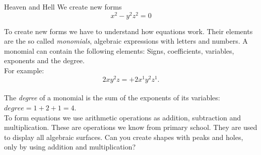 \begin{surferPage}{Heaven and Hell}
We create new forms \\
\smallskip
\[x^2	- y^2z^2	= 0\]

\singlespacing
To create new forms we have to understand how equations work. Their elements are the so called  {\it monomials}, algebraic expressions with letters and numbers.
\singlespacing
A monomial can contain the following elements:
Signs, coefficients, variables, exponents and the degree.\\
\singlespacing
For example: 
\smallskip
\[2xy^2z = +2x^1y^2z^1.\]
\\
\smallskip
The  {\it degree} of a monomial is the sum of the exponents of its variables: $degree = 1+2+1=4$.  \\
\singlespacing
To form equations we use arithmetic operations as addition, subtraction and multiplication. These are operations we know from primary school. They are used to display all algebraic surfaces.
\singlespacing
Can you create shapes with peaks and holes, only by using addition and multiplication?
\end{surferPage}
